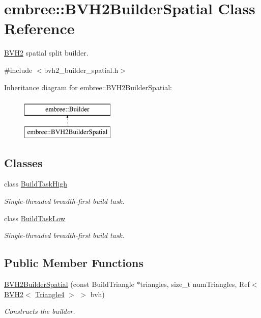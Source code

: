 \hypertarget{classembree_1_1_b_v_h2_builder_spatial}{
\section{embree::BVH2BuilderSpatial Class Reference}
\label{classembree_1_1_b_v_h2_builder_spatial}
}


\hyperlink{classembree_1_1_b_v_h2}{BVH2} spatial split builder.  




{\ttfamily \#include $<$bvh2\_\-builder\_\-spatial.h$>$}

Inheritance diagram for embree::BVH2BuilderSpatial:\begin{figure}[H]
\begin{center}
\leavevmode
\includegraphics[height=2.000000cm]{classembree_1_1_b_v_h2_builder_spatial}
\end{center}
\end{figure}
\subsection*{Classes}
\begin{DoxyCompactItemize}
\item 
class \hyperlink{classembree_1_1_b_v_h2_builder_spatial_1_1_build_task_high}{BuildTaskHigh}
\begin{DoxyCompactList}\small\item\em Single-\/threaded breadth-\/first build task. \item\end{DoxyCompactList}\item 
class \hyperlink{classembree_1_1_b_v_h2_builder_spatial_1_1_build_task_low}{BuildTaskLow}
\begin{DoxyCompactList}\small\item\em Single-\/threaded breadth-\/first build task. \item\end{DoxyCompactList}\end{DoxyCompactItemize}
\subsection*{Public Member Functions}
\begin{DoxyCompactItemize}
\item 
\hyperlink{classembree_1_1_b_v_h2_builder_spatial_a81b3321a25c2bf179e17e64b1e0f4879}{BVH2BuilderSpatial} (const BuildTriangle $\ast$triangles, size\_\-t numTriangles, Ref$<$ \hyperlink{classembree_1_1_b_v_h2}{BVH2}$<$ \hyperlink{structembree_1_1_triangle4}{Triangle4} $>$ $>$ bvh)
\begin{DoxyCompactList}\small\item\em Constructs the builder. \item\end{DoxyCompactList}\end{DoxyCompactItemize}

